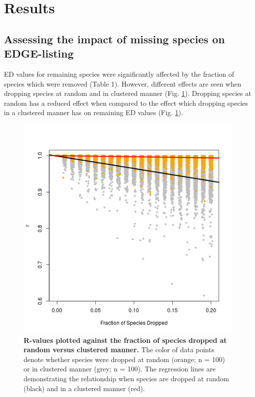 \documentclass[12pt,english]{article}
\begin{document}
\section*{Results}
\subsection*{Assessing the impact of missing species on EDGE-listing}

ED values for remaining species were significantly affected by the
fraction of species which were removed (Table 1). However, different
effects are seen when dropping species at random and in clustered
manner (Fig. \ref{randomVsClustered}). Dropping species at random has a reduced effect
when compared to the effect which dropping species in a clustered
manner has on remaining ED values (Fig. \ref{randomVsClustered}).

\begin{figure}[!ht]
  \center
  \includegraphics[width=.5\textwidth]{randomVsCluster.png}
  \caption{\textbf{R-values plotted against the fraction of species 
  dropped at random versus clustered manner.} The color of data points denote 
  whether species were dropped at random (orange; n = 100) or in clustered 
  manner (grey; n = 100). The regression lines are demonstrating the relationship 
  when species are dropped at random (black) and in a clustered manner (red).}
  \label{randomVsClustered}
\end{figure}
\end{document}
